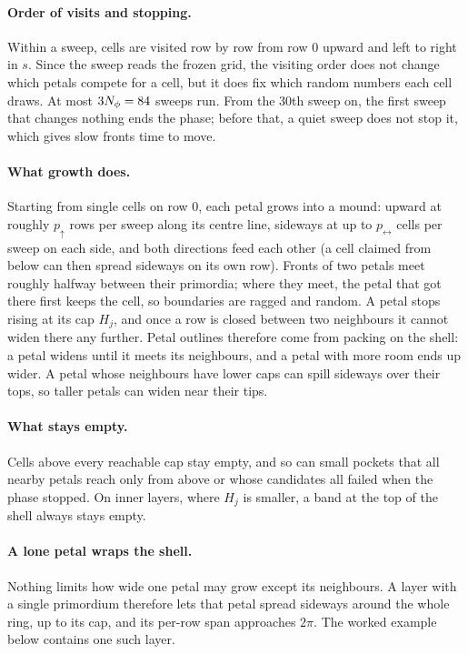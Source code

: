 \paragraph{Order of visits and stopping.} Within a sweep, cells are visited
row by row from row 0 upward and left to right in $s$. Since the sweep reads
the frozen grid, the visiting order does not change which petals compete for
a cell, but it does fix which random numbers each cell draws. At most
$3N_\phi = 84$ sweeps run. From the 30th sweep on, the first sweep that changes
nothing ends the phase; before that, a quiet sweep does not stop it, which
gives slow fronts time to move.

\paragraph{What growth does.} Starting from single cells on row 0, each petal
grows into a mound: upward at roughly $p_\uparrow$ rows per sweep along its
centre line, sideways at up to $p_\leftrightarrow$ cells per sweep on each
side, and both directions feed each other (a cell claimed from below can
then spread sideways on its own row). Fronts of two petals meet roughly
halfway between their primordia; where they meet, the petal that got there
first keeps the cell, so boundaries are ragged and random. A petal stops
rising at its cap $H_j$, and once a row is closed between two neighbours it
cannot widen there any further. Petal outlines therefore come from packing on
the shell: a petal widens until it meets its neighbours, and a petal with
more room ends up wider. A petal whose neighbours have lower caps can spill
sideways over their tops, so taller petals can widen near their tips.

\paragraph{What stays empty.} Cells above every reachable cap stay empty,
and so can small pockets that all nearby petals reach only from above or
whose candidates all failed when the phase stopped. On inner layers, where
$H_j$ is smaller, a band at the top of the shell always stays empty.

\paragraph{A lone petal wraps the shell.} Nothing limits how wide one petal
may grow except its neighbours. A layer with a single primordium therefore
lets that petal spread sideways around the whole ring, up to its cap, and its
per-row span approaches $2\pi$. The worked example below contains one such
layer.


